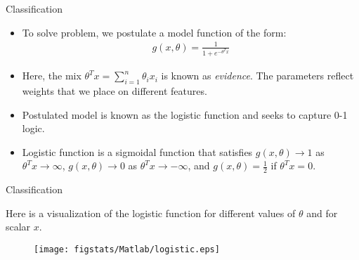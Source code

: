 \documentclass[9pt]{beamer}
\begin{document}
\begin{frame}{Classification}


\begin{itemize}
\item To solve problem, we postulate a model function of the form:
\begin{align*}
g(x,\theta)=\frac{1}{1+e^{-\theta^Tx}}
\end{align*}
 
\item Here, the mix $\theta^Tx=\sum_{i=1}^n\theta_ix_i$ is known as {\em evidence}. The parameters reflect weights that we place on different features. 

\item Postulated model is known as the logistic function and seeks to capture 0-1 logic. 
\item Logistic function is a sigmoidal function that satisfies $g(x,\theta)\to 1$ as $\theta^Tx\to \infty$, $g(x,\theta)\to 0$ as $\theta^Tx\to -\infty$,  and $g(x,\theta)=\frac{1}{2}$ if $\theta^Tx=0$. 

\end{itemize}

\end{frame}

%
\begin{frame}{Classification}

Here is a visualization of the logistic function for different values of $\theta$ and for scalar $x$. 
\begin{figure}[!htb]
    \centering
	\texttt{[image: figstats/Matlab/logistic.eps]}
\end{figure}
\end{frame}


\end{document}
